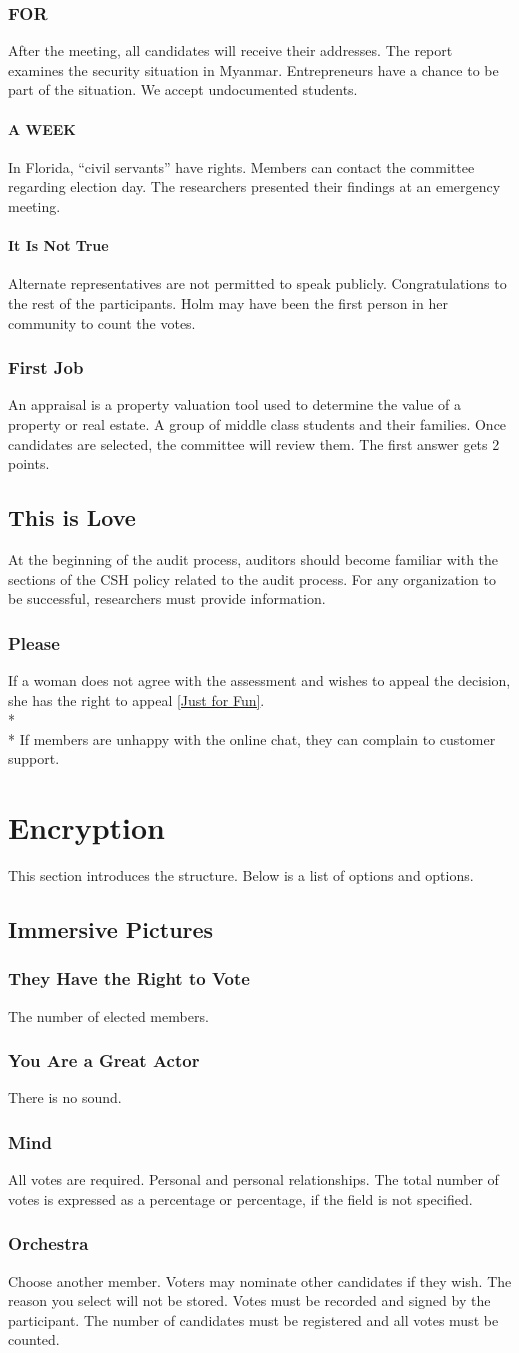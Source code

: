 \documentclass{article}
\newcommand{\article}[1]{\section{#1} \label{#1}}
\newcommand{\asection}[1]{\subsection{#1} \label{#1}}
\newcommand{\asubsection}[1]{\subsubsection{#1} \label{#1}}
\newcommand{\asubsubsection}[1]{\paragraph{#1} \label{#1}}
\begin{document}
\asubsection{FOR}
After the meeting, all candidates will receive their addresses.
The report examines the security situation in Myanmar.
Entrepreneurs have a chance to be part of the situation.
We accept undocumented students.

\asubsubsection{A WEEK}
In Florida, “civil servants” have rights.
Members can contact the committee regarding election day.
The researchers presented their findings at an emergency meeting.

\asubsubsection{It Is Not True}
Alternate representatives are not permitted to speak publicly.
Congratulations to the rest of the participants. Holm may have been the first person in her community to count the votes.

\asubsection{First Job}
An appraisal is a property valuation tool used to determine the value of a property or real estate.
A group of middle class students and their families.
Once candidates are selected, the committee will review them.
The first answer gets 2 points.

\asection{This is Love}
At the beginning of the audit process, auditors should become familiar with the sections of the CSH policy related to the audit process.
For any organization to be successful, researchers must provide information.

\asubsection{Please}
If a woman does not agree with the assessment and wishes to appeal the decision, she has the right to appeal \ref{Just for Fun}.
\\* \\*
If members are unhappy with the online chat, they can complain to customer support.

\article{Encryption}
This section introduces the structure. Below is a list of options and options.

\asection{Immersive Pictures}

\asubsection{They Have the Right to Vote}
The number of elected members.

\asubsection{You Are a Great Actor}
There is no sound.

\asubsection{Mind}
All votes are required.
Personal and personal relationships.
The total number of votes is expressed as a percentage or percentage, if the field is not specified.


\asubsection{Orchestra}
Choose another member.
Voters may nominate other candidates if they wish. The reason you select will not be stored.
Votes must be recorded and signed by the participant.
The number of candidates must be registered and all votes must be counted.
\end{document}
